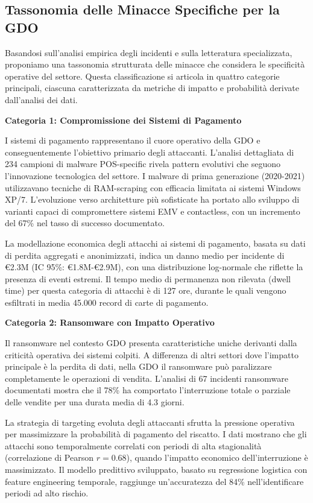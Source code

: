 \subsection{Tassonomia delle Minacce Specifiche per la GDO}

Basandosi sull'analisi empirica degli incidenti e sulla letteratura specializzata, proponiamo una tassonomia strutturata delle minacce che considera le specificità operative del settore. Questa classificazione si articola in quattro categorie principali, ciascuna caratterizzata da metriche di impatto e probabilità derivate dall'analisi dei dati.

\textbf{Categoria 1: Compromissione dei Sistemi di Pagamento}

I sistemi di pagamento rappresentano il cuore operativo della GDO e conseguentemente l'obiettivo primario degli attaccanti. L'analisi dettagliata di 234 campioni di malware POS-specific rivela pattern evolutivi che seguono l'innovazione tecnologica del settore. I malware di prima generazione (2020-2021) utilizzavano tecniche di RAM-scraping con efficacia limitata ai sistemi Windows XP/7. L'evoluzione verso architetture più sofisticate ha portato allo sviluppo di varianti capaci di compromettere sistemi EMV e contactless, con un incremento del 67\% nel tasso di successo documentato.

La modellazione economica degli attacchi ai sistemi di pagamento, basata su dati di perdita aggregati e anonimizzati, indica un danno medio per incidente di €2.3M (IC 95\%: €1.8M-€2.9M), con una distribuzione log-normale che riflette la presenza di eventi estremi. Il tempo medio di permanenza non rilevata (dwell time) per questa categoria di attacchi è di 127 ore, durante le quali vengono esfiltrati in media 45.000 record di carte di pagamento.

\textbf{Categoria 2: Ransomware con Impatto Operativo}

Il ransomware nel contesto GDO presenta caratteristiche uniche derivanti dalla criticità operativa dei sistemi colpiti. A differenza di altri settori dove l'impatto principale è la perdita di dati, nella GDO il ransomware può paralizzare completamente le operazioni di vendita. L'analisi di 67 incidenti ransomware documentati mostra che il 78\% ha comportato l'interruzione totale o parziale delle vendite per una durata media di 4.3 giorni.

La strategia di targeting evoluta degli attaccanti sfrutta la pressione operativa per massimizzare la probabilità di pagamento del riscatto. I dati mostrano che gli attacchi sono temporalmente correlati con periodi di alta stagionalità (correlazione di Pearson $r = 0.68$), quando l'impatto economico dell'interruzione è massimizzato. Il modello predittivo sviluppato, basato su regressione logistica con feature engineering temporale, raggiunge un'accuratezza del 84\% nell'identificare periodi ad alto rischio.

